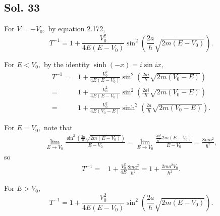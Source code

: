     \subsection*{Sol. 33}
    For $V=-V_0,$ by equation 2.172,
    $$
    T^{-1} = 1 + \frac{V_0^2}{4E(E-V_0)}\sin^2\left(\frac{2a}{\hbar}\sqrt{2m(E-V_0)}\right).
    $$

    For $E<V_0,$ by the identity $\sinh (-x) = i\sin ix,$
    \begin{align*}
        T^{-1} = & 1 + \frac{V_0^2}{4E(E-V_0)}\sin^2\left(\frac{2ai}{\hbar}\sqrt{2m(V_0-E)}\right)\\
        = & 1 + \frac{V_0^2}{4E(E-V_0)}\sin^2\left(\frac{2ai}{\hbar}\sqrt{2m(V_0-E)}\right)\\
        = & 1 + \frac{V_0^2}{4E(V_0-E)}\sinh^2\left(\frac{2a}{\hbar}\sqrt{2m(V_0-E)}\right).
    \end{align*}


    For $E=V_0,$ note that
    \begin{align*}
        \lim_{E\to V_0}\frac{\sin^2\left(\frac{2a}{\hbar}\sqrt{2m(E-V_0)}\right)}{E-V_0}
        = \lim_{E\to V_0}\frac{\frac{4a^2}{\hbar^2}2m(E-V_0)}{E-V_0} = 
        \frac{8ma^2}{\hbar^2},
    \end{align*}
    so 
    \begin{align*}
        T^{-1} = & 1 + \frac{V_0^2}{4E}\frac{8ma^2}{\hbar^2} = 1 + \frac{2ma^2V_0}{\hbar^2}.
    \end{align*}
    

    For $E>V_0,$ 
     $$
    T^{-1} = 1 + \frac{V_0^2}{4E(E-V_0)}\sin^2\left(\frac{2a}{\hbar}\sqrt{2m(E-V_0)}\right).
    $$

